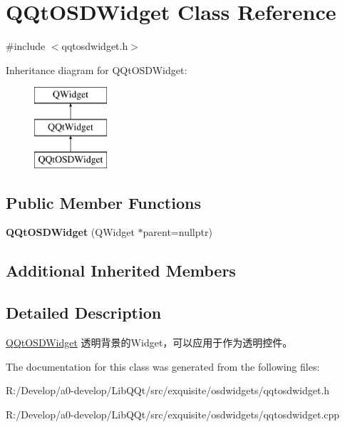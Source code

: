 \hypertarget{class_q_qt_o_s_d_widget}{}\section{Q\+Qt\+O\+S\+D\+Widget Class Reference}
\label{class_q_qt_o_s_d_widget}


{\ttfamily \#include $<$qqtosdwidget.\+h$>$}

Inheritance diagram for Q\+Qt\+O\+S\+D\+Widget\+:\begin{figure}[H]
\begin{center}
\leavevmode
\includegraphics[height=3.000000cm]{class_q_qt_o_s_d_widget}
\end{center}
\end{figure}
\subsection*{Public Member Functions}
\begin{DoxyCompactItemize}
\item 
\mbox{\label{class_q_qt_o_s_d_widget_aa2f219456c62896cecdf6f86d64d6fb4}} 
{\bfseries Q\+Qt\+O\+S\+D\+Widget} (Q\+Widget $\ast$parent=nullptr)
\end{DoxyCompactItemize}
\subsection*{Additional Inherited Members}


\subsection{Detailed Description}
\mbox{\hyperlink{class_q_qt_o_s_d_widget}{Q\+Qt\+O\+S\+D\+Widget}} 透明背景的\+Widget，可以应用于作为透明控件。 

The documentation for this class was generated from the following files\+:\begin{DoxyCompactItemize}
\item 
R\+:/\+Develop/a0-\/develop/\+Lib\+Q\+Qt/src/exquisite/osdwidgets/qqtosdwidget.\+h\item 
R\+:/\+Develop/a0-\/develop/\+Lib\+Q\+Qt/src/exquisite/osdwidgets/qqtosdwidget.\+cpp\end{DoxyCompactItemize}
